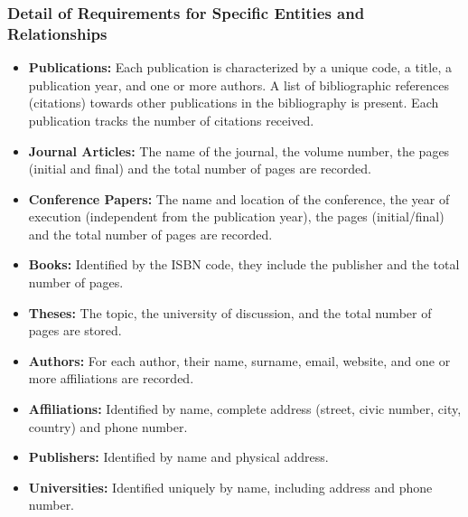 \documentclass[a4paper,12pt]{article}
\begin{document}
\subsubsection{Detail of Requirements for Specific Entities and Relationships}
\begin{itemize}[label=\textbullet]
    \item \textbf{Publications:} Each publication is characterized by a unique code, a title, a publication year, and one or more authors. A list of bibliographic references (citations) towards other publications in the bibliography is present. Each publication tracks the number of citations received.
    
    \item \textbf{Journal Articles:} The name of the journal, the volume number, the pages (initial and final) and the total number of pages are recorded.
    
    \item \textbf{Conference Papers:} The name and location of the conference, the year of execution (independent from the publication year), the pages (initial/final) and the total number of pages are recorded.
    
    \item \textbf{Books:} Identified by the ISBN code, they include the publisher and the total number of pages.
    
    \item \textbf{Theses:} The topic, the university of discussion, and the total number of pages are stored.
    
    \item \textbf{Authors:} For each author, their name, surname, email, website, and one or more affiliations are recorded.
    
    \item \textbf{Affiliations:} Identified by name, complete address (street, civic number, city, country) and phone number.
    
    \item \textbf{Publishers:} Identified by name and physical address.
    
    \item \textbf{Universities:} Identified uniquely by name, including address and phone number.
\end{itemize}
\end{document}
